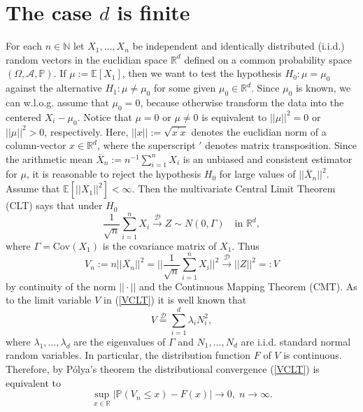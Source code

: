 \documentclass[sn-mathphys,Numbered]{sn-jnl}%
\theoremstyle{thmstyleone}%
\theoremstyle{thmstyletwo}%
\theoremstyle{thmstylethree}%
\begin{document}
\section{The case $d$ is finite}
For each $n \in \mathbb{N}$ let $X_1,\ldots,X_n$ be independent and identically distributed (i.i.d.) random vectors in the euclidian space $\mathbb{R}^d$
defined on a common probability space $(\Omega,\mathcal{A},\mathbb{P})$. If $\mu:=\mathbb{E}[X_1]$, then we want to test the hypothesis $H_0:\mu=\mu_0$ against the alternative $H_1:\mu \neq \mu_0$ for some given $\mu_0 \in \mathbb{R}^d$. Since $\mu_0$ is known, we can w.l.o.g. assume that $\mu_0=0$, because otherwise transform the data into the centered $X_i-\mu_0$.
Notice that $\mu=0$ or $\mu \neq 0$ is equivalent to $||\mu||^2 = 0$ or $||\mu||^2>0$, respectively.
Here, $||x||:=\sqrt{x^\prime x}$ denotes the euclidian norm of a column-vector $x \in \mathbb{R}^d$, where the superscript $\prime$ denotes matrix transposition. Since the arithmetic
mean $\overline{X}_n :=n^{-1}\sum_{i=1}^n X_i$ is an unbiased and consistent estimator for $\mu$, it is reasonable to reject the hypothesis $H_0$ for large values of $||\overline{X}_n||^2$. Assume that $\mathbb{E}[||X_1||^2] < \infty.$ Then the multivariate Central Limit Theorem (CLT) says that under $H_0$
\begin{equation} \label{CLT}
   \frac{1}{\sqrt{n}}\sum_{i=1}^n X_i \stackrel{\mathcal{D}}{\rightarrow} Z \sim N(0,\Gamma)\quad \text{in } \mathbb{R}^d,
\end{equation}
where $\Gamma = \text{Cov}(X_1)$ is the covariance matrix of $X_1$. Thus
\begin{equation} \label{VCLT}
 V_n := n ||\overline{X_n}||^2=||\frac{1}{\sqrt{n}} \sum_{i=1}^n X_i||^2 \stackrel{\mathcal{D}}{\rightarrow} ||Z||^2 =:V
\end{equation}
by continuity of the norm $||\cdot||$ and the Continuous Mapping Theorem (CMT).
As to the limit variable $V$ in (\ref{VCLT}) it is well known that
$$
 V \stackrel{\mathcal{D}}{=} \sum_{i=1}^d \lambda_i N_i^2,
$$
where $\lambda_1,\ldots,\lambda_d$ are the eigenvalues of $\Gamma$ and $N_1,\ldots,N_d$ are i.i.d. standard normal random variables.
In particular, the distribution function $F$ of $V$ is continuous. Therefore,
by P\'{o}lya's theorem the distributional convergence (\ref{VCLT}) is equivalent to
\begin{equation} \label{uniformVn}
 \sup_{x \in \mathbb{R}}|\mathbb{P}(V_n \le x)-F(x)| \rightarrow 0, \;  n \rightarrow \infty.
\end{equation}
\end{document}
